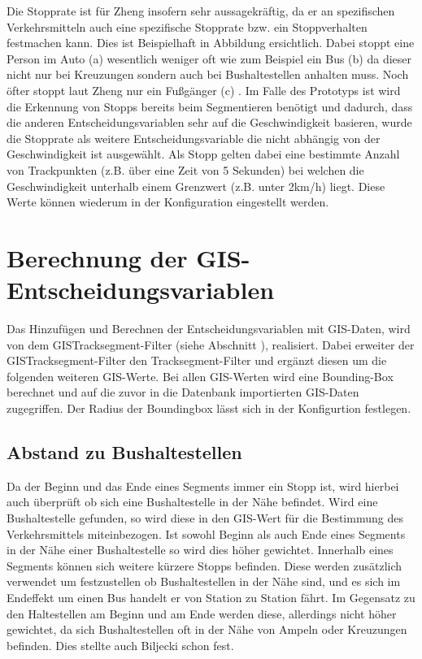 Die Stopprate ist für Zheng insofern sehr aussagekräftig, da er an spezifischen Verkehrsmitteln auch eine spezifische Stopprate bzw. ein Stoppverhalten festmachen kann. Dies ist Beispielhaft in Abbildung  ersichtlich. Dabei stoppt eine Person im Auto (a) wesentlich weniger oft wie zum Beispiel ein Bus (b) da dieser nicht nur bei Kreuzungen sondern auch bei Bushaltestellen anhalten muss. Noch öfter stoppt laut Zheng nur ein Fußgänger (c) \cite{zheng_understanding_2010}. Im Falle des Prototyps ist wird die Erkennung von Stopps bereits beim Segmentieren benötigt und dadurch, dass die anderen Entscheidungsvariablen sehr auf die Geschwindigkeit basieren, wurde die Stopprate als weitere Entscheidungsvariable die nicht abhängig von der Geschwindigkeit ist ausgewählt. Als Stopp gelten dabei eine bestimmte Anzahl von Trackpunkten (z.B. über eine Zeit von 5 Sekunden) bei welchen die Geschwindigkeit unterhalb einem Grenzwert (z.B. unter 2km/h) liegt. Diese Werte können wiederum in der Konfiguration eingestellt werden.

\clearpage

\section{Berechnung der GIS-Entscheidungsvariablen}
\label{gisdaten}
Das Hinzufügen und Berechnen der Entscheidungsvariablen mit GIS-Daten, wird von dem GISTracksegment-Filter (siehe Abschnitt ), realisiert. Dabei erweiter der GISTracksegment-Filter den Tracksegment-Filter und ergänzt diesen um die folgenden weiteren GIS-Werte. Bei allen GIS-Werten wird eine Bounding-Box berechnet und auf die zuvor in die Datenbank importierten GIS-Daten zugegriffen. Der Radius der Boundingbox lässt sich in der Konfigurtion festlegen.

\subsection{Abstand zu Bushaltestellen}
Da der Beginn und das Ende eines Segments immer ein Stopp ist, wird hierbei auch überprüft ob sich eine Bushaltestelle in der Nähe befindet. Wird eine Bushaltestelle gefunden, so wird diese in den GIS-Wert für die Bestimmung des Verkehrsmittels miteinbezogen. Ist sowohl Beginn als auch Ende eines Segments in der Nähe einer Bushaltestelle so wird dies höher gewichtet. 
Innerhalb eines Segments können sich weitere kürzere Stopps befinden. Diese werden zusätzlich verwendet um festzustellen ob Bushaltestellen in der Nähe sind, und es sich im Endeffekt um einen Bus handelt er von Station zu Station fährt. Im Gegensatz zu den Haltestellen am Beginn und am Ende werden diese, allerdings nicht höher gewichtet, da sich Bushaltestellen oft in der Nähe von Ampeln oder Kreuzungen befinden. Dies stellte auch Biljecki \cite{biljecki_transportation_2013} schon fest.

